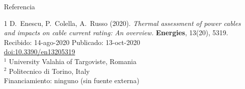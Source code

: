 \documentclass[aspectratio=169]{beamer}
\begin{document}
\begin{frame}{Referencia}
  \begin{thebibliography}{1}\small
      D.~Enescu, P.~Colella, A.~Russo (2020).
      \textit{Thermal assessment of power cables and impacts on cable
      current rating: An overview.}
      \textbf{Energies}, 13(20), 5319.\\
      Recibido: 14-ago-2020 \quad Publicado: 13-oct-2020\\
      \href{https://doi.org/10.3390/en13205319}
           {doi:10.3390/en13205319}\\[0.4em]
      \footnotesize
      $^1$ University Valahia of Targoviste, Romania\\
      $^2$ Politecnico di Torino, Italy\\
      Financiamiento: ninguno (sin fuente externa)
  \end{thebibliography}
\end{frame}
\end{document}
